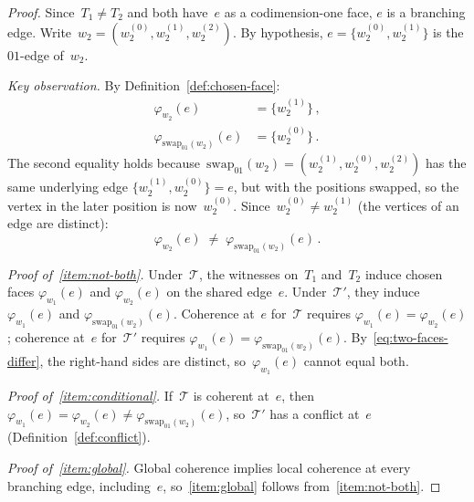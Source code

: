 \documentclass[11pt,a4paper]{article}
\theoremstyle{plain}
\theoremstyle{definition}
\theoremstyle{remark}
\newcommand{\cT}{\mathcal{T}}
\newcommand{\swapAB}{\mathrm{swap}_{01}}
\newcommand{\chosenface}{\varphi}
\begin{document}
\begin{proof}
Since~$T_1 \neq T_2$ and both have~$e$ as a codimension-one face,
$e$ is a branching edge.
Write~$w_2 = (w_2^{(0)}, w_2^{(1)}, w_2^{(2)})$. By hypothesis,
$e = \{w_2^{(0)}, w_2^{(1)}\}$ is the $01$-edge of~$w_2$.

\medskip\noindent\textit{Key observation.}
By Definition~\ref{def:chosen-face}:
\begin{align*}
  \chosenface_{w_2}(e) &= \{w_2^{(1)}\}\,,\\
  \chosenface_{\swapAB(w_2)}(e) &= \{w_2^{(0)}\}\,.
\end{align*}
The second equality holds because~$\swapAB(w_2)
= (w_2^{(1)}, w_2^{(0)}, w_2^{(2)})$ has the same underlying edge
$\{w_2^{(1)}, w_2^{(0)}\} = e$, but with the positions swapped, so the
vertex in the later position is now~$w_2^{(0)}$.
Since~$w_2^{(0)} \neq w_2^{(1)}$ (the vertices of an edge are distinct):
\begin{equation}
  \label{eq:two-faces-differ}
  \chosenface_{w_2}(e) \;\neq\; \chosenface_{\swapAB(w_2)}(e)\,.
\end{equation}

\medskip\noindent\textit{Proof of~\ref{item:not-both}.}
Under~$\cT$, the witnesses on~$T_1$ and~$T_2$ induce chosen faces
$\chosenface_{w_1}(e)$ and $\chosenface_{w_2}(e)$ on the shared edge~$e$.
Under~$\cT'$, they induce $\chosenface_{w_1}(e)$ and
$\chosenface_{\swapAB(w_2)}(e)$.
Coherence at~$e$ for~$\cT$ requires
$\chosenface_{w_1}(e) = \chosenface_{w_2}(e)$;
coherence at~$e$ for~$\cT'$ requires
$\chosenface_{w_1}(e) = \chosenface_{\swapAB(w_2)}(e)$.
By~\eqref{eq:two-faces-differ}, the right-hand sides are distinct,
so~$\chosenface_{w_1}(e)$ cannot equal both.

\medskip\noindent\textit{Proof of~\ref{item:conditional}.}
If~$\cT$ is coherent at~$e$, then
$\chosenface_{w_1}(e) = \chosenface_{w_2}(e) \neq
\chosenface_{\swapAB(w_2)}(e)$, so~$\cT'$ has a conflict at~$e$
(Definition~\ref{def:conflict}).

\medskip\noindent\textit{Proof of~\ref{item:global}.}
Global coherence implies local coherence at every branching edge,
including~$e$, so~\ref{item:global} follows from~\ref{item:not-both}.
\end{proof}
\end{document}
